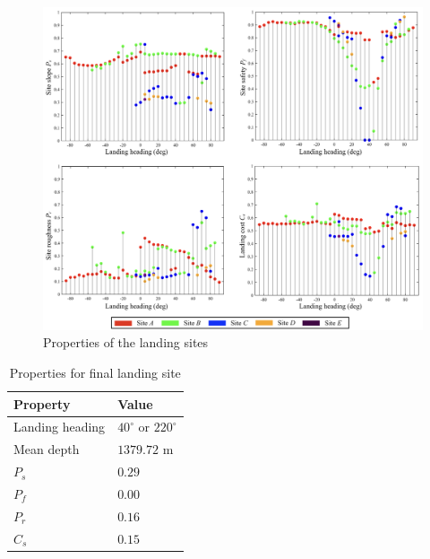\begin{figure}[!ht]
\centering
\includegraphics[width=\textwidth]{./images/mehul23.png}
\caption{Properties of the landing sites}
\label{f:mehul23}
\end{figure}


\begin{table}[!ht]
\centering
\caption{Properties for final landing site}
\begin{tabular}{  |p{6cm}  p{4cm}| }
\hline
\textbf{Property} & \textbf{Value}\\ \hline 
Landing heading & $40^\circ$ or $220^\circ$ \\
Mean depth & $1379.72$ m\\
$P_s$ & $0.29$\\
$P_f$ & $0.00$\\
$P_r$ & $0.16$\\
$C_s$ & $0.15$\\
\hline
\end{tabular}
\label{t:table5}
\end{table}
